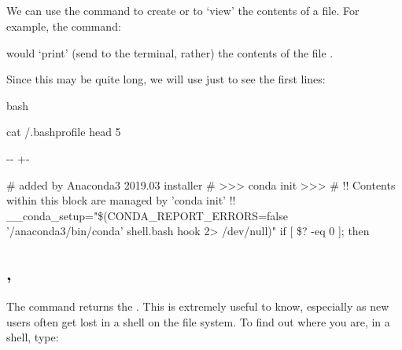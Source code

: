 \documentclass[letterpaper,10pt,english]{sphinxmanual}
\newlength\nbsphinxcodecellspacing
\begin{document}
\subsection{}
\label{\detokenize{Appendix1:cat}}
We can use the command  to create or to ‘view’ the contents of a file. For example, the command:

\begin{sphinxVerbatim}[commandchars=\\\{\}]
 
\end{sphinxVerbatim}

would ‘print’ (send to the terminal, rather) the contents of the file .

Since this may be quite long, we will use  just to see the first  lines:

{
\begin{sphinxVerbatim}[commandchars=\\\{\}]
\llap{\color{nbsphinxin}[12]:\,\hspace{\fboxrule}\hspace{\fboxsep}}\PYGZpc{}\PYGZpc{}bash

cat \PYGZti{}/.bash\PYGZus{}profile  head \PYGZhy{}5
\end{sphinxVerbatim}
}

{

\kern-\sphinxverbatimsmallskipamount\kern-\baselineskip
\kern+\FrameHeightAdjust\kern-\fboxrule
\vspace{\nbsphinxcodecellspacing}

\begin{sphinxVerbatim}[commandchars=\\\{\}]
\# added by Anaconda3 2019.03 installer
\# >>> conda init >>>
\# !! Contents within this block are managed by 'conda init' !!
\_\_conda\_setup="\$(CONDA\_REPORT\_ERRORS=false '/anaconda3/bin/conda' shell.bash hook 2> /dev/null)"
if [ \$? -eq 0 ]; then
\end{sphinxVerbatim}
}


\subsection{, }
\label{\detokenize{Appendix1:pwd,-cd}}
The command  returns the . This is extremely useful to know, especially as new users often get lost in a shell on the file system. To find out where you are, in a shell, type:
\end{document}
